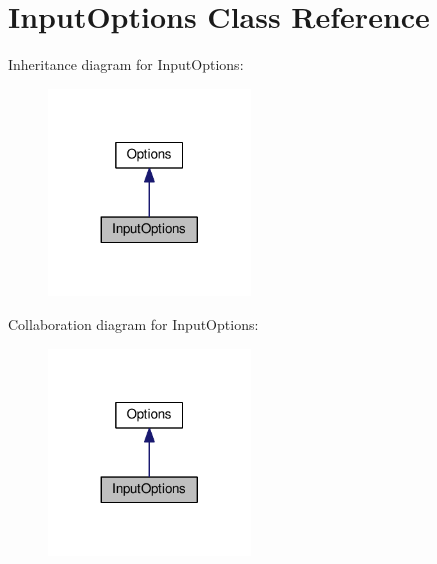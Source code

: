 \hypertarget{classInputOptions}{}\section{Input\+Options Class Reference}
\label{classInputOptions}


Inheritance diagram for Input\+Options\+:\nopagebreak
\begin{figure}[H]
\begin{center}
\leavevmode
\includegraphics[width=152pt]{classInputOptions__inherit__graph}
\end{center}
\end{figure}


Collaboration diagram for Input\+Options\+:\nopagebreak
\begin{figure}[H]
\begin{center}
\leavevmode
\includegraphics[width=152pt]{classInputOptions__coll__graph}
\end{center}
\end{figure}

